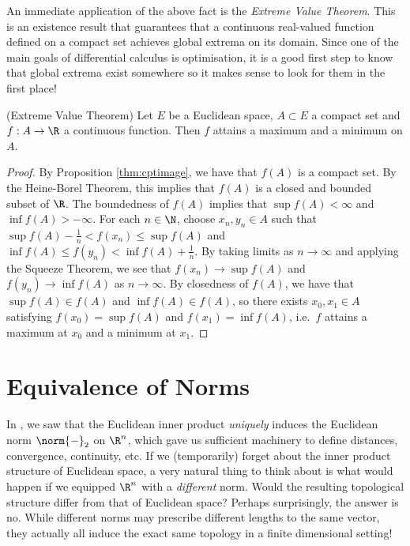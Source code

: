 An immediate application of the above fact is the \emph{Extreme Value Theorem}. This is an existence result that guarantees that a continuous real-valued function defined on a compact set achieves global extrema on its domain. Since one of the main goals of differential calculus is optimisation, it is a good first step to know that global extrema exist somewhere so it makes sense to look for them in the first place!
 \begin{theorem}
   (Extreme Value Theorem) Let \( E \) be a Euclidean space, \( A\subset E \) a compact set and \( f:A\to\R \) a continuous function. Then \( f \) attains a maximum and a minimum on \( A \).
 \end{theorem}
 \begin{proof}
   By Proposition \ref{thm:cptimage}, we have that \( f(A) \) is a compact set. By the Heine-Borel Theorem, this implies that \( f(A) \) is a closed and bounded subset of \( \R \). The boundedness of \( f(A) \) implies that \( \sup f(A)<\infty \) and \( \inf f(A)>-\infty \). For each \( n\in\N \), choose \( x_n,y_n\in A \) such that \( \sup f(A)-\frac{1}{n}<f(x_n)\leq\sup f(A) \) and \( \inf f(A)\leq f(y_n)<\inf f(A)+\frac{1}{n} \). By taking limits as \( n\to\infty \) and applying the Squeeze Theorem, we see that \( f(x_n)\to\sup f(A) \) and \( f(y_n)\to\inf f(A) \) as \( n\to\infty \). By closedness of \( f(A) \), we have that \( \sup f(A)\in f(A) \) and \( \inf f(A)\in f(A) \), so there exists \( x_0,x_1\in A \) satisfying \( f(x_0)=\sup f(A) \) and \( f(x_1)=\inf f(A) \), i.e.\ \( f \) attains a maximum at \( x_0 \) and a minimum at \( x_1 \).
 \end{proof}
 
 \section{Equivalence of Norms}
 In , we saw that the Euclidean inner product \emph{uniquely} induces the Euclidean norm \( \norm{-}_2 \) on \( \R^n \), which gave us sufficient machinery to define distances, convergence, continuity, etc. If we (temporarily) forget about the inner product structure of Euclidean space, a very natural thing to think about is what would happen if we equipped \( \R^n \) with a \emph{different} norm. Would the resulting topological structure differ from that of Euclidean space? Perhaps surprisingly, the answer is no. While different norms may prescribe different lengths to the same vector, they actually all induce the exact same topology in a finite dimensional setting!

